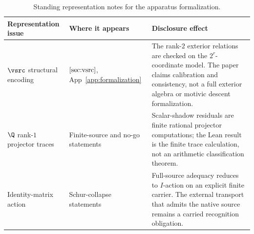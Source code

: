 \begin{table}[tbp]
\centering
\small
\caption{Standing representation notes for the apparatus formalization.}
\label{tab:representation-notes}
\begin{tabularx}{\textwidth}{@{}>{\raggedright\arraybackslash}p{}
>{\raggedright\arraybackslash}p{}
>{\raggedright\arraybackslash}X@{}}
\toprule
Representation issue & Where it appears & Disclosure effect \\
\midrule
\(\vsrc\) structural encoding &
\(\Cref{sec:vsrc}\), App~\ref{app:formalization} &
The rank-\(2\) exterior relations are checked on the \(2^r\)-coordinate
model.  The paper claims calibration and consistency, not a full exterior
algebra or motivic descent formalization. \\
\addlinespace
\(\Q\) rank-\(1\) projector traces &
Finite-source and no-go statements &
Scalar-shadow residuals are finite rational projector computations; the
Lean result is the finite trace calculation, not an arithmetic
classification theorem. \\
\addlinespace
Identity-matrix action &
Schur-collapse statements &
Full-source adequacy reduces to \(I\)-action on an explicit finite carrier.
The external transport that admits the native source remains a carried
recognition obligation. \\
\bottomrule
\end{tabularx}
\end{table}
